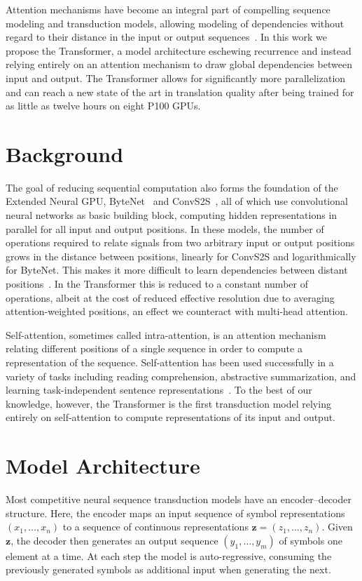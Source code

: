 \documentclass[10pt,letterpaper]{article}
\begin{document}
Attention mechanisms have become an integral part of compelling sequence modeling
and transduction models, allowing modeling of dependencies without regard to their
distance in the input or output sequences~\citep{bahdanau2015neural,luong2015effective}.
In this work we propose the Transformer, a model architecture eschewing recurrence
and instead relying entirely on an attention mechanism to draw global dependencies
between input and output. The Transformer allows for significantly more
parallelization and can reach a new state of the art in translation quality after
being trained for as little as twelve hours on eight P100 GPUs.

\section{Background}
The goal of reducing sequential computation also forms the foundation of the
Extended Neural GPU, ByteNet~\citep{kalchbrenner2016neural} and
ConvS2S~\citep{gehring2017convolutional}, all of which use convolutional neural
networks as basic building block, computing hidden representations in parallel for
all input and output positions. In these models, the number of operations required
to relate signals from two arbitrary input or output positions grows in the
distance between positions, linearly for ConvS2S and logarithmically for ByteNet.
This makes it more difficult to learn dependencies between distant
positions~\citep{hochreiter1997long}. In the Transformer this is reduced to a
constant number of operations, albeit at the cost of reduced effective resolution
due to averaging attention-weighted positions, an effect we counteract with
multi-head attention.

Self-attention, sometimes called intra-attention, is an attention mechanism
relating different positions of a single sequence in order to compute a
representation of the sequence. Self-attention has been used successfully in a
variety of tasks including reading comprehension, abstractive summarization, and
learning task-independent sentence representations~\citep{cheng2016long,
parikh2016decomposable,lin2017structured}. To the best of our knowledge, however,
the Transformer is the first transduction model relying entirely on self-attention
to compute representations of its input and output.

\section{Model Architecture}
\label{sec:model}
Most competitive neural sequence transduction models have an encoder--decoder
structure. Here, the encoder maps an input sequence of symbol representations
$(x_1,\dots,x_n)$ to a sequence of continuous representations
$\mathbf{z}=(z_1,\dots,z_n)$. Given $\mathbf{z}$, the decoder then generates an
output sequence $(y_1,\dots,y_m)$ of symbols one element at a time. At each step
the model is auto-regressive, consuming the previously generated symbols as
additional input when generating the next.
\end{document}
